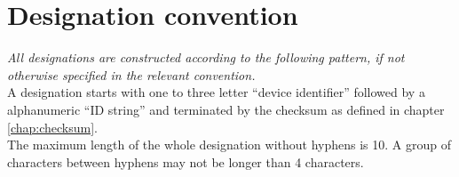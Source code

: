 %
%
%
%
%
%
%

\section{Designation convention}

\textit{All designations are constructed according to the following pattern, if
not otherwise specified in the relevant convention.} \\


A designation starts with one to three letter ``device identifier'' followed by
a alphanumeric ``ID string'' and terminated by the checksum as defined in
chapter \ref{chap:checksum}. \\

The maximum length of the whole designation without hyphens is 10. A group of
characters between hyphens may not be longer than 4 characters.



%
%



